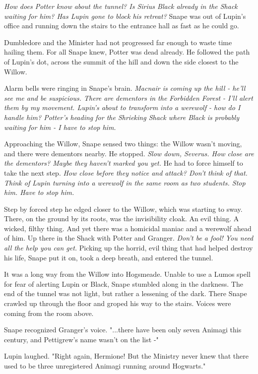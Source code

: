 \emph{How does Potter know about the tunnel? Is Sirius Black already in the Shack waiting for him? Has Lupin gone to block his retreat?} Snape was out of Lupin's office and running down the stairs to the entrance hall as fast as he could go.

Dumbledore and the Minister had not progressed far enough to waste time hailing them. For all Snape knew, Potter was dead already. He followed the path of Lupin's dot, across the summit of the hill and down the side closest to the Willow.

Alarm bells were ringing in Snape's brain. \emph{Macnair is coming up the hill - he'll see me and be suspicious. There are dementors in the Forbidden Forest - I'll alert them by my movement. Lupin's about to transform into a werewolf - how do I handle him? Potter's heading for the Shrieking Shack where Black is probably waiting for him - I have to stop him.}

Approaching the Willow, Snape sensed two things: the Willow wasn't moving, and there were dementors nearby. He stopped. \emph{Slow down, Severus. How close are the dementors? Maybe they haven't marked you yet.} He had to force himself to take the next step. \emph{How close before they notice and attack? Don't think of that. Think of Lupin turning into a werewolf in the same room as two students. Stop him. Have to stop him.}

Step by forced step he edged closer to the Willow, which was starting to sway. There, on the ground by its roots, was the invisibility cloak. An evil thing. A wicked, filthy thing. And yet there was a homicidal maniac and a werewolf ahead of him. Up there in the Shack with Potter and Granger. \emph{Don't be a fool! You need all the help you can get.} Picking up the horrid, evil thing that had helped destroy his life, Snape put it on, took a deep breath, and entered the tunnel.

It was a long way from the Willow into Hogsmeade. Unable to use a Lumos spell for fear of alerting Lupin or Black, Snape stumbled along in the darkness. The end of the tunnel was not light, but rather a lessening of the dark. There Snape crawled up through the floor and groped his way to the stairs. Voices were coming from the room above.

Snape recognized Granger's voice. "...there have been only seven Animagi this century, and Pettigrew's name wasn't on the list -"

Lupin laughed. "Right again, Hermione! But the Ministry never knew that there used to be three unregistered Animagi running around Hogwarts."

